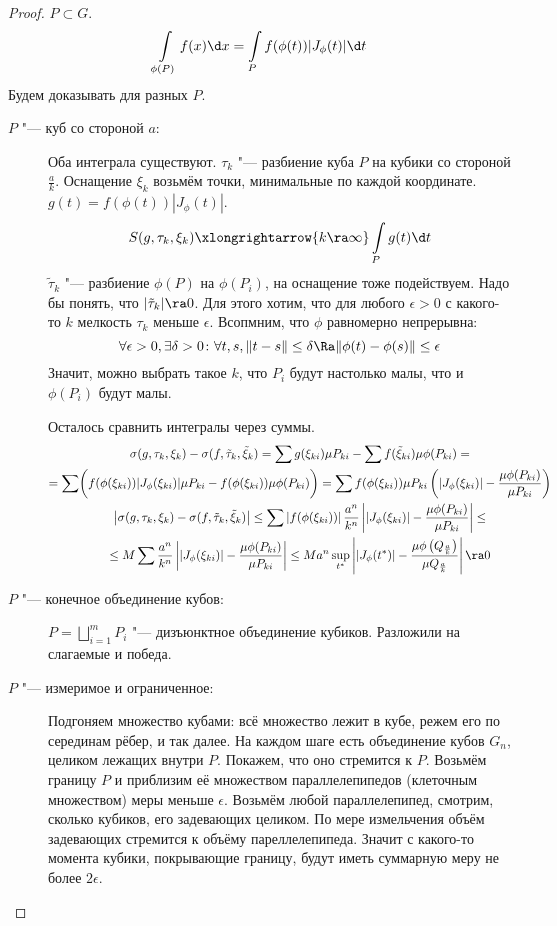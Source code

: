 \begin{proof}
	$P \subset G$.
	\[ \int\limits_{\phi(P)} f(x) \d x = \int\limits_P f(\phi(t)) |J_\phi(t)| \d t \]
	Будем доказывать для разных $P$.
	\begin{description}
	\item[$P$ "--- куб со стороной $a$:]
		Оба интеграла существуют.
		$\tau_k$ "--- разбиение куба $P$ на кубики со стороной $\frac{a}k$.
		Оснащение $\xi_k$ возьмём точки, минимальные по каждой координате.
		$g(t) = f(\phi(t)) |J_\phi(t)|$.
		\[
			S(g, \tau_k, \xi_k) \xlongrightarrow{k \ra \infty} \int\limits_P g(t) \d t \\
		\]
		$\tilde \tau_k$ "--- разбиение $\phi(P)$  на $\phi(P_i)$, на оснащение тоже подействуем.
		Надо бы понять, что $|\tilde \tau_k| \ra 0$.
		Для этого хотим, что для любого $\epsilon > 0$ с какого-то $k$ мелкость $\tau_k$ меньше $\epsilon$.
		Всопмним, что $\phi$ равномерно непрерывна:
		\[
			\forall \epsilon > 0, \exists \delta > 0\colon \forall t,s, \|t-s\| \le \delta \Ra \|\phi(t) - \phi(s)\| \le \epsilon
		\]
		Значит, можно выбрать такое $k$, что $P_i$ будут настолько малы, что и $\phi(P_i)$ будут малы.

		Осталось сравнить интегралы через суммы.
		\begin{gather*}
			\sigma(g, \tau_k, \xi_k) - \sigma(f, \tilde \tau_k, \tilde \xi_k)
			= \sum g(\xi_{ki}) \mu P_{ki} - \sum f(\tilde\xi_{ki}) \mu \phi(P_{ki}) = \\
			= \sum \biggl( f(\phi(\xi_{ki})) |J_\phi (\xi_{ki})| \mu P_{ki} - f(\phi(\xi_{ki})) \mu \phi(P_{ki}) \biggr)
			= \sum f(\phi(\xi_{ki})) \mu P_{ki} \left( |J_\phi (\xi_{ki})| - \frac{\mu \phi(P_{ki})}{\mu P_{ki}} \right) \\
			\left| \sigma(g, \tau_k, \xi_k) - \sigma(f, \tilde \tau_k, \tilde \xi_k) \right|
			\le \sum\left|f(\phi(\xi_{ki}))\right|\frac{a^n}{k^n} \left||J_\phi (\xi_{ki})| - \frac{\mu\phi(P_{ki})}{\mu P_{ki}} \right| \le \\ 
			\le M \sum \frac{a^n}{k^n} \left| |J_\phi (\xi_{ki})| - \frac{\mu \phi(P_{ki})}{\mu P_{ki}} \right|
			\le M a^n \sup_{t^*} \left| |J_\phi (t^*)| - \frac{\mu \phi\left(Q_{\frac{a}k}\right)}{\mu Q_{\frac{a}k}} \right| \ra 0
		\end{gather*}

	\item[$P$ "--- конечное объединение кубов:]
		$P = \bigsqcup_{i=1}^m P_i$ "--- дизъюнктное объединение кубиков.
		Разложили на слагаемые и победа.

	\item[$P$ "--- измеримое и ограниченное:]
		Подгоняем множество кубами: всё множество лежит в кубе, режем его по серединам рёбер, и так далее.
		На каждом шаге есть объединение кубов $G_n$, целиком лежащих внутри $P$.
		Покажем, что оно стремится к $P$.
		Возьмём границу $P$ и приблизим её множеством параллелепипедов (клеточным множеством) меры меньше $\epsilon$.
		Возьмём любой параллелепипед, смотрим, сколько кубиков, его задевающих целиком.
		По мере измельчения объём задевающих стремится к объёму пареллелепипеда.
		Значит с какого-то момента кубики, покрывающие границу, будут иметь суммарную меру не более $2\epsilon$.
	\end{description}
\end{proof}
